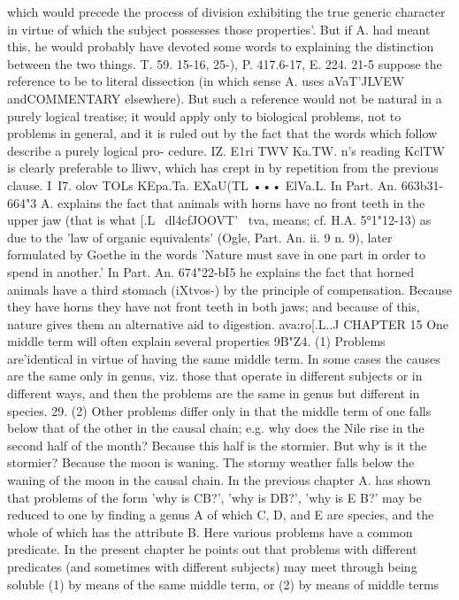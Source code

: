 {{{{{{{{{{{{{{{{{{{{{{{{{{{{{{{{{{{{{{{{{{{{{{{{{{{{{{{{{{{{{{{{{{{{which would precede the process of division exhibiting the true
generic character in virtue of which the subject possesses those
properties'. But if A. had meant this, he would probably have
devoted some words to explaining the distinction between the
two things.
T. 59. 15-16, 25-{), P. 417.6-17, E. 224. 21-5 suppose the reference
to be to literal dissection (in which sense A. uses aVaT'JLVEW andCOMMENTARY
elsewhere). But such a reference would not be natural
in a purely logical treatise; it would apply only to biological
problems, not to problems in general, and it is ruled out by the
fact that the words which follow describe a purely logical pro-
cedure.
IZ. E1ri TWV Ka.TW. n's reading KclTW is clearly preferable to
lliwv, which has crept in by repetition from the previous clause.
I~I7. olov TOLs KEpa.Ta. EXaU(TL ••• ElVa.L. In Part. An. 663b31-
664"3 A. explains the fact that animals with horns have no front
teeth in the upper jaw (that is what [.L~ dl4cfJOOVT' ~tva, means;
cf. H.A. 5°1"12-13) as due to the 'law of organic equivalents'
(Ogle, Part. An. ii. 9 n. 9), later formulated by Goethe in the words
'Nature must save in one part in order to spend in another.' In
Part. An. 674"22-bI5 he explains the fact that horned animals
have a third stomach (iXtvos-) by the principle of compensation.
Because they have horns they have not front teeth in both jaws;
and because of this, nature gives them an alternative aid to
digestion.
ava:ro[.L..J
CHAPTER 15
One middle term will often explain several properties
9B"Z4. (1) Problems are'identical in virtue of having the same
middle term. In some cases the causes are the same only in
genus, viz. those that operate in different subjects or in different
ways, and then the problems are the same in genus but different
in species.
29. (2) Other problems differ only in that the middle term of
one falls below that of the other in the causal chain; e.g. why does
the Nile rise in the second half of the month? Because this half
is the stormier. But why is it the stormier? Because the moon
is waning. The stormy weather falls below the waning of the
moon in the causal chain.
In the previous chapter A. has shown that problems of the
form 'why is CB?', 'why is DB?', 'why is E B?' may be reduced
to one by finding a genus A of which C, D, and E are species,
and the whole of which has the attribute B. Here various
problems have a common predicate. In the present chapter he
points out that problems with different predicates (and sometimes
with different subjects) may meet through being soluble (1) by
means of the same middle term, or (2) by means of middle terms
}}}}}}}}}}}}}}}}}}}}}}}}}}}}}}}}}}}}}}}}}}}}}}}}}}}}}}}}}}}}}}}}}}}}}
